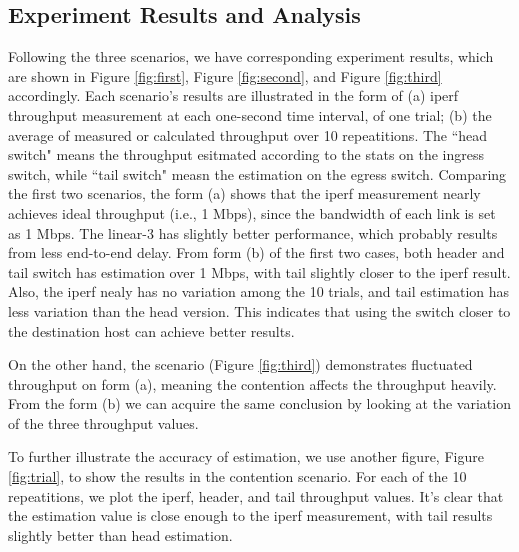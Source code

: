 \documentclass[12pt]{article}
\begin{document}
\subsection{Experiment Results and Analysis}

Following the three scenarios, we have corresponding experiment results, which are shown in Figure \ref{fig:first}, Figure \ref{fig:second}, and Figure \ref{fig:third} accordingly. Each scenario's results are illustrated in the form of (a) iperf throughput measurement at each one-second time interval, of one trial; (b) the average of measured or calculated throughput over 10 repeatitions. The ``head switch" means the throughput esitmated according to the stats on the ingress switch, while ``tail switch" measn the estimation on the egress switch. Comparing the first two scenarios, the form (a) shows that the iperf measurement nearly achieves ideal throughput (i.e., 1 Mbps), since the bandwidth of each link is set as 1 Mbps. The linear-3 has slightly better performance, which probably results from less end-to-end delay. From form (b) of the first two cases, both header and tail switch has estimation over 1 Mbps, with tail slightly closer to the iperf result. Also, the iperf nealy has no variation among the 10 trials, and tail estimation has less variation than the head version. This indicates that using the switch closer to the destination host can achieve better results. 

On the other hand, the scenario (Figure \ref{fig:third}) demonstrates fluctuated throughput on form (a), meaning the contention affects the throughput heavily. From the form (b) we can acquire the same conclusion by looking at the variation of the three throughput values. 

To further illustrate the accuracy of estimation, we use another figure, Figure \ref{fig:trial}, to show the results in the contention scenario. For each of the 10 repeatitions, we plot the iperf, header, and tail throughput values. It's clear that the estimation value is close enough to the iperf measurement, with tail results slightly better than head estimation.
\end{document}
